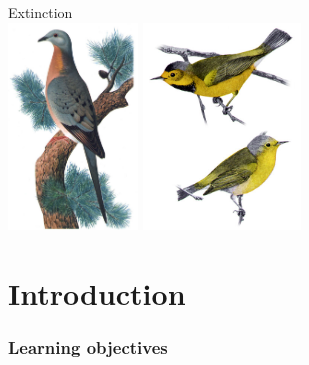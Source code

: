\documentclass[color=usenames,dvipsnames]{beamer}\usepackage[]{graphicx}\usepackage[]{xcolor}
\begin{document}
\begin{frame}[plain]
  \begin{center}
    {\Huge Extinction} \\
    \vfill
    \includegraphics[height=5.5cm,keepaspectratio]{figs/passenger-pigeon} \hspace{0.5cm}
    \includegraphics[height=5.5cm,keepaspectratio]{figs/Vermivora_bachmanii} %
  \end{center}
\end{frame}




\section{Introduction}


\begin{frame}[plain]
  \frametitle{Learning objectives}
  \tableofcontents%
\end{frame}
\end{document}
